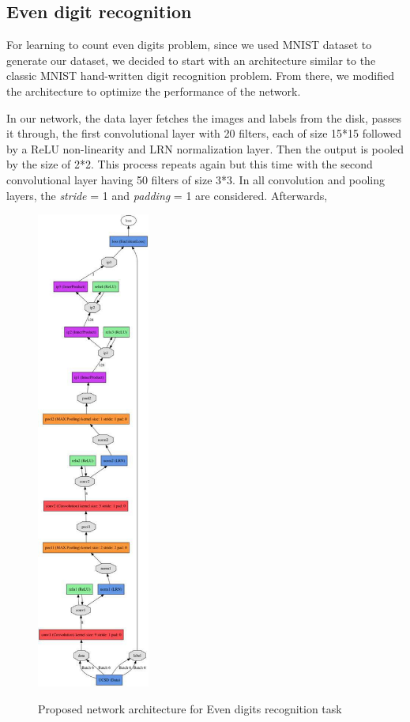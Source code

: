 \subsection{Even digit recognition}

For learning to count even digits problem, since we used MNIST dataset to generate our dataset, we decided to start with an architecture similar to the classic MNIST hand-written digit recognition problem\cite{lecun1995comparison}. From there, we modified the architecture to optimize the performance of the network.

\indent In our network, the data layer fetches the images and labels from the disk, passes it through, the first convolutional layer with 20 filters, each of size 15*15 followed by a ReLU non-linearity and LRN normalization layer. Then the output is pooled by the size of 2*2. This process repeats again but this time with the second convolutional layer having 50 filters of size 3*3. In all convolution and pooling layers, the \textit{stride} = 1 and \textit{padding} = 1 are considered. Afterwards,

\begin{figure}
  \centering
   {\includegraphics[width=0.33\textwidth]{images/model}}
	\caption{Proposed network architecture for Even digits recognition task}
	\label{fig:l2cNet}
\end{figure}

